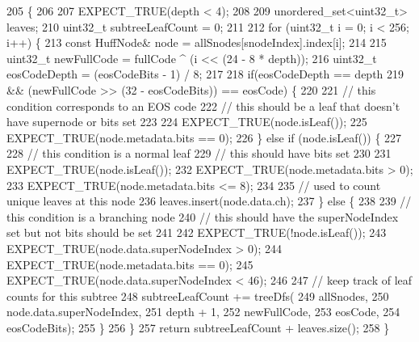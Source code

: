 \begin{DoxyCode}
205                                  \{
206 
207   EXPECT\_TRUE(depth < 4);
208 
209   unordered\_set<uint32\_t> leaves;
210   uint32\_t subtreeLeafCount = 0;
211 
212   \textcolor{keywordflow}{for} (uint32\_t i = 0; i < 256; i++) \{
213     \textcolor{keyword}{const} HuffNode& node = allSnodes[snodeIndex].index[i];
214 
215     uint32\_t newFullCode = fullCode ^ (i << (24 - 8 * depth));
216     uint32\_t eosCodeDepth = (eosCodeBits - 1) / 8;
217 
218     \textcolor{keywordflow}{if}(eosCodeDepth == depth
219         && (newFullCode >> (32 - eosCodeBits)) == eosCode) \{
220 
221       \textcolor{comment}{// this condition corresponds to an EOS code}
222       \textcolor{comment}{// this should be a leaf that doesn't have supernode or bits set}
223 
224       EXPECT\_TRUE(node.isLeaf());
225       EXPECT\_TRUE(node.metadata.bits == 0);
226     \} \textcolor{keywordflow}{else} \textcolor{keywordflow}{if} (node.isLeaf()) \{
227 
228       \textcolor{comment}{// this condition is a normal leaf}
229       \textcolor{comment}{// this should have bits set}
230 
231       EXPECT\_TRUE(node.isLeaf());
232       EXPECT\_TRUE(node.metadata.bits > 0);
233       EXPECT\_TRUE(node.metadata.bits <= 8);
234 
235       \textcolor{comment}{// used to count unique leaves at this node}
236       leaves.insert(node.data.ch);
237     \} \textcolor{keywordflow}{else} \{
238 
239       \textcolor{comment}{// this condition is a branching node}
240       \textcolor{comment}{// this should have the superNodeIndex set but not bits should be set}
241 
242       EXPECT\_TRUE(!node.isLeaf());
243       EXPECT\_TRUE(node.data.superNodeIndex > 0);
244       EXPECT\_TRUE(node.metadata.bits == 0);
245       EXPECT\_TRUE(node.data.superNodeIndex < 46);
246 
247       \textcolor{comment}{// keep track of leaf counts for this subtree}
248       subtreeLeafCount += treeDfs(
249           allSnodes,
250           node.data.superNodeIndex,
251           depth + 1,
252           newFullCode,
253           eosCode,
254           eosCodeBits);
255     \}
256   \}
257   \textcolor{keywordflow}{return} subtreeLeafCount + leaves.size();
258 \}
\end{DoxyCode}
